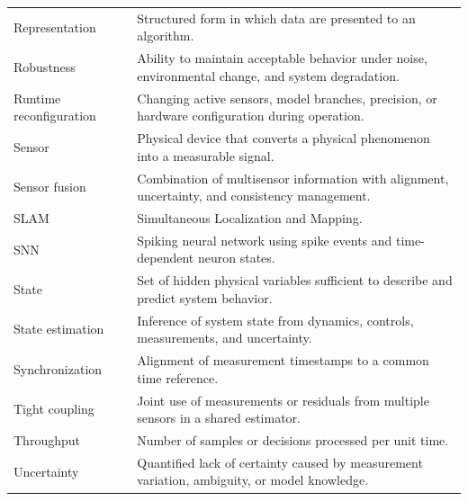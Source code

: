 \begin{longtable}{@{}p{3.6cm}p{10.1cm}@{}}
Representation & Structured form in which data are presented to an algorithm. \\
Robustness & Ability to maintain acceptable behavior under noise, environmental change, and system degradation. \\
Runtime reconfiguration & Changing active sensors, model branches, precision, or hardware configuration during operation. \\
Sensor & Physical device that converts a physical phenomenon into a measurable signal. \\
Sensor fusion & Combination of multisensor information with alignment, uncertainty, and consistency management. \\
SLAM & Simultaneous Localization and Mapping. \\
SNN & Spiking neural network using spike events and time-dependent neuron states. \\
State & Set of hidden physical variables sufficient to describe and predict system behavior. \\
State estimation & Inference of system state from dynamics, controls, measurements, and uncertainty. \\
Synchronization & Alignment of measurement timestamps to a common time reference. \\
Tight coupling & Joint use of measurements or residuals from multiple sensors in a shared estimator. \\
Throughput & Number of samples or decisions processed per unit time. \\
Uncertainty & Quantified lack of certainty caused by measurement variation, ambiguity, or model knowledge. \\
\bottomrule
\end{longtable}
